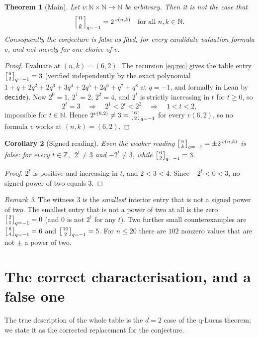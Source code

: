 \documentclass[11pt]{article}
\newtheorem{theorem}{Theorem}
\newtheorem{corollary}[theorem]{Corollary}
\theoremstyle{definition}
\theoremstyle{remark}
\newtheorem{remark}[theorem]{Remark}
\newcommand{\N}{\mathbb{N}}
\newcommand{\Z}{\mathbb{Z}}
\newcommand{\qbinm}[2]{\left[\genfrac{}{}{0pt}{}{#1}{#2}\right]_{q=-1}}
\begin{document}
\begin{theorem}[Main]\label{thm:main}
Let $v : \N \times \N \to \N$ be arbitrary. Then it is \emph{not} the case that
\[
\qbinm{n}{k} = 2^{\,v(n,k)} \quad\text{for all } n,k \in \N .
\]
Consequently the conjecture is false as filed, for \emph{every} candidate
valuation formula $v$, and not merely for one choice of $v$.
\end{theorem}

\begin{proof}
Evaluate at $(n,k)=(6,2)$. The recursion \eqref{eq:rec} gives the table entry
$\qbinm{6}{2}=3$ (verified independently by the exact polynomial
$1+q+2q^{2}+2q^{3}+3q^{4}+2q^{5}+2q^{6}+q^{7}+q^{8}$ at $q=-1$, and formally
in Lean by \texttt{decide}). Now $2^{0}=1$, $2^{1}=2$, $2^{2}=4$, and $2^{t}$
is strictly increasing in $t$ for $t\ge 0$, so
\[
2^{t} = 3 \quad\Longrightarrow\quad 2^{1} < 2^{t} < 2^{2}
\quad\Longrightarrow\quad 1 < t < 2,
\]
impossible for $t \in \N$. Hence $2^{v(6,2)} \neq 3 = \qbinm{6}{2}$ for every
$v(6,2)$, so no formula $v$ works at $(n,k)=(6,2)$.
\end{proof}

\begin{corollary}[Signed reading]\label{cor:signed}
Even the weaker reading $\qbinm{n}{k} = \pm 2^{\,v(n,k)}$ is false: for every
$t \in \Z$, $\;2^{t} \neq 3$ and $-2^{t} \neq 3$, while $\qbinm{6}{2}=3$.
\end{corollary}

\begin{proof}
$2^{t}$ is positive and increasing in $t$, and $2<3<4$. Since $-2^{t}<0<3$, no
signed power of two equals $3$.
\end{proof}

\begin{remark}
The witness $3$ is the \emph{smallest} interior entry that is not a signed
power of two. The smallest entry that is not a power of two at all is the zero
$\qbinm{2}{1}=0$ (and $0$ is not $2^{t}$ for any $t$). Two further small
counterexamples are $\qbinm{8}{4}=6$ and $\qbinm{10}{2}=5$. For $n \le 20$
there are $102$ nonzero values that are not $\pm$ a power of two.
\end{remark}

\section{The correct characterisation, and a false one}

The true description of the whole table is the $d=2$ case of the q-Lucas
theorem; we state it as the corrected replacement for the conjecture.
\end{document}
